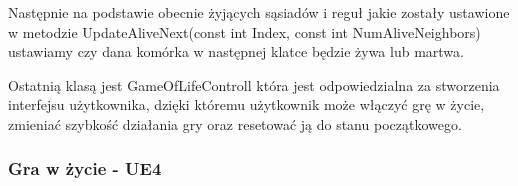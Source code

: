 \documentclass[a4paper,12pt,reqno]{article}
\begin{document}


Następnie na podstawie obecnie żyjących sąsiadów i reguł jakie zostały ustawione w metodzie UpdateAliveNext(const int Index, const int NumAliveNeighbors) ustawiamy czy dana komórka w następnej klatce będzie żywa lub martwa.



Ostatnią klasą jest GameOfLifeControll która jest odpowiedzialna
za stworzenia interfejsu użytkownika, dzięki któremu użytkownik może włączyć grę w życie, zmieniać szybkość działania gry oraz resetować ją do stanu początkowego.
\subsubsection{Gra w życie - UE4}
\end{document}
